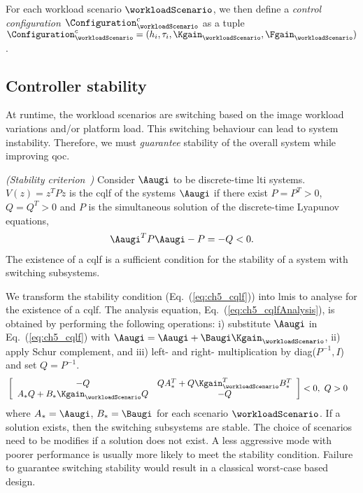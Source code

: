 For each workload scenario $\workloadScenario$, we then define a \emph{control configuration} $\Configuration_{\workloadScenario}^c$ as a tuple $\Configuration_{\workloadScenario}^c = (h_{i},\tau_{i}, \Kgain_{\workloadScenario}, \Fgain_{\workloadScenario})$.

\subsection{Controller stability}
\label{sec:ch5_controller_stability}
At runtime, the workload scenarios are switching based on the image workload variations and/or platform load. 
This switching behaviour can lead to system instability. Therefore, we must \emph{guarantee} stability of the overall system while improving \gls{qoc}.

\begin{theorem}
\emph{(Stability criterion~\cite{12_sunstability})}
Consider $\Aaugi$ to be discrete-time \gls{lti} systems. $V(z)=z^T P z$ is the \gls{cqlf} of the systems $\Aaugi$ if there exist $P=P^T>0$, $Q=Q^T>0$ and $P$ is the simultaneous solution of the discrete-time Lyapunov equations,
\begin{eqnarray}
\Aaugi^T P \Aaugi - P= - Q < 0.
\label{eq:ch5_cqlf}
\end{eqnarray}
The existence of a \gls{cqlf} is a sufficient condition for the stability of a system with switching subsystems.
\end{theorem}
We transform the stability condition (Eq.~(\ref{eq:ch5_cqlf})) into \glspl{lmi} to analyse for the existence of a \gls{cqlf}. The analysis equation, Eq.~(\ref{eq:ch5_cqlfAnalysis}), is obtained by performing the following operations: i) substitute $\Aaugi$ in Eq.~(\ref{eq:ch5_cqlf}) with $\Aaugi=\Aaugi+\Baugi \Kgain_{\workloadScenario}$, ii) apply Schur complement, and iii) left- and right- multiplication by diag($P^{ - 1}, I$) and set $Q = P^{ - 1}$.
\small
\begin{eqnarray}
& \left[ \begin{array}{cc} -Q & Q A_{*}^T + Q \Kgain_{\workloadScenario}^T B_{*}^T  \\ A_{*} Q + B_{*} \Kgain_{\workloadScenario} Q & -Q \end{array} \right] < 0,\ Q > 0  \label{eq:ch5_cqlfAnalysis}
\end{eqnarray}
\normalsize
where $A_{*}= \Aaugi$, $B_{*} = \Baugi$ for each scenario $\workloadScenario$. If a solution exists, then the switching subsystems are stable. The choice of scenarios need to be modifies if a solution does not exist. A less aggressive mode with poorer performance is usually more likely to meet the stability condition. Failure to guarantee switching stability would result in a classical worst-case based design.

